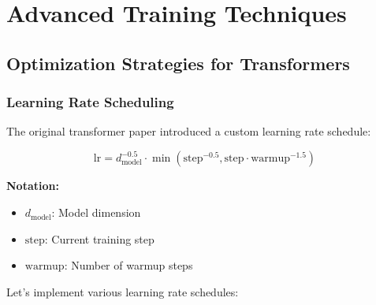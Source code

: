 
\section{Advanced Training Techniques}

\subsection{Optimization Strategies for Transformers}

\subsubsection{Learning Rate Scheduling}

The original transformer paper introduced a custom learning rate schedule:

\begin{equation}
\text{lr} = d_{\text{model}}^{-0.5} \cdot \min(\text{step}^{-0.5}, \text{step} \cdot \text{warmup}^{-1.5})
\end{equation}

\begin{notationbox}
\textbf{Notation:}
\begin{itemize}
    \item $d_{\text{model}}$: Model dimension
    \item $\text{step}$: Current training step
    \item $\text{warmup}$: Number of warmup steps
\end{itemize}
\end{notationbox}

Let's implement various learning rate schedules:

